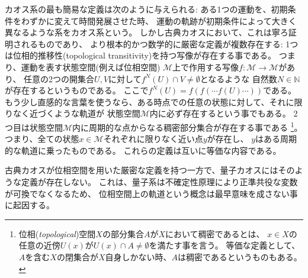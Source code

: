 カオス系の最も簡易な定義は次のように与えられる:
ある1つの運動を、初期条件をわずかに変えて時間発展させた時、
運動の軌跡が初期条件によって大きく異なるような系をカオス系という。
しかし古典カオスにおいて、これは寧ろ証明されるものであり、
より根本的かつ数学的に厳密な定義が複数存在する\cite{hsiao}:
1つは位相的推移性(topological transitivity)を持つ写像が存在する事である。
つまり、運動を表す状態空間(例えば位相空間)
$\mathcal{M}$上で作用する写像$f: \mathcal{M}\to\mathcal{M}$があり、
任意の2つの開集合$U, V$に対して$f^N(U)\cap V \neq \emptyset$となるような
自然数$N\in\mathbb{N}$が存在するというものである。
ここで$f^N(U) = f(f(\cdots f(U) \cdots ))$である。
もう少し直感的な言葉を使うなら、ある時点での任意の状態に対して、それに限りなく近づくような軌道が
状態空間$\mathcal{M}$内に必ず存在するという事でもある。
2つ目は状態空間$\mathcal{M}$内に周期的な点からなる稠密部分集合が存在する事である
\footnote{位相(\textit{topological})空間$X$の部分集合$A$が$X$において稠密であるとは、
	$x\in X$の任意の近傍$U(x)$が$U(x)\cap A \neq \emptyset$を満たす事を言う。
	等価な定義として、$A$を含む$X$の閉集合が$X$自身しかない時、$A$は稠密であるというものもある。}。
つまり、全ての状態$x\in\mathcal{M}$それぞれに限りなく近い点$y$が存在し、
$y$はある周期的な軌道に乗ったものである。
これらの定義は互いに等価な内容である。

古典カオスが位相空間を用いた厳密な定義を持つ一方で、量子カオスにはそのような定義が存在しない。
これは、量子系は不確定性原理により正準共役な変数が可換でなくなるため、
位相空間上の軌道という概念は最早意味を成さない事に起因する。

